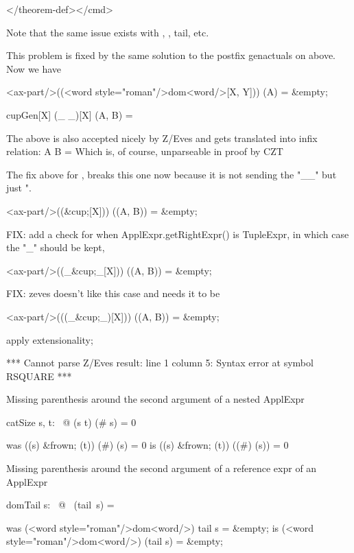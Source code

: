</theorem-def></cmd>

 Note that the same issue exists with \bigcap, \bigcup, tail, etc.

This problem is fixed by the same solution to the postfix genactuals on \inv above. Now we have

<ax-part/>((<word style="roman"/>dom<word/>[X, Y])) (A)  =  &empty;

\begin{theorem}{cupGen}[X]
    (\_ \cup \_)[X] (A, B) = \emptyset
\end{theorem}
 The above is also accepted nicely by Z/Eves and gets translated into infix relation:
  A \cup[X] B = \emptyset
 Which is, of course, unparseable in proof by CZT

The fix above for \inv, breaks this one now because it is not sending the "_\cup_" but just "\cup.

<ax-part/>((&cup;[X])) ((A, B))  =  &empty;

FIX: add a check for when ApplExpr.getRightExpr() is TupleExpr, in which case the "_" should be kept,

<ax-part/>((_&cup;_[X])) ((A, B))  =  &empty;

FIX: zeves doesn't like this case and needs it to be

<ax-part/>(((_&cup;_)[X])) ((A, B))  =  &empty;

\begin{zproof}[cupGen]
   apply extensionality;
\end{zproof}
***
Cannot parse Z/Eves result:
line 1 column 5: Syntax error at symbol RSQUARE
***

Missing parenthesis around the second argument of a nested ApplExpr
\begin{theorem}{catSize}
\forall  s, t: \seq~\nat @ (s \cat  t) (\# s) = 0
\end{theorem}
was ((s) &frown; (t)) (#) (s)  =  0
is  ((s) &frown; (t)) ((#) (s))  =  0

Missing parenthesis around the second argument of a reference expr of an ApplExpr
\begin{theorem}{domTail}
\forall  s: \seq~\nat @ \dom~(tail~s) = \emptyset
\end{theorem}
was (<word style="roman"/>dom<word/>) tail s  =  &empty;
is  (<word style="roman"/>dom<word/>) (tail s)  =  &empty;